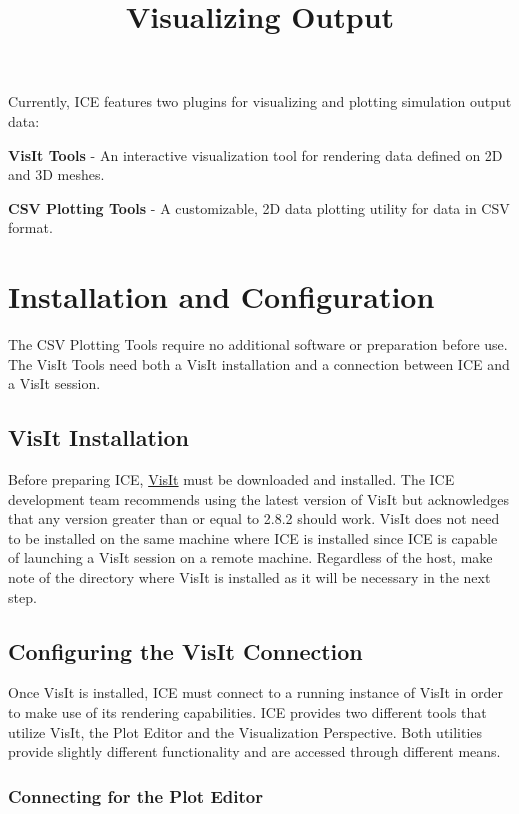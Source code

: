 \documentclass{article}
\begin{document}
\title{Visualizing Output}

Currently, ICE features two plugins for visualizing and plotting simulation
output data:

\textbf{VisIt Tools} - An interactive visualization tool for rendering data
defined on 2D and 3D meshes.

\textbf{CSV Plotting Tools} - A customizable, 2D data plotting utility for data
in CSV format.

\section{Installation and Configuration}

The CSV Plotting Tools require no additional software or preparation before use.
The VisIt Tools need both a VisIt installation and a connection between ICE and
a VisIt session.

\subsection{VisIt Installation} 

Before preparing ICE,
\href{https://wci.llnl.gov/simulation/computer-codes/visit/}{VisIt} must be
downloaded and installed. The ICE development team recommends using the latest
version of VisIt but acknowledges that any version greater than or equal to
2.8.2 should work. VisIt does not need to be installed on the same machine where
ICE is installed since ICE is capable of launching a VisIt session on a remote
machine. Regardless of the host, make note of the directory where VisIt is
installed as it will be necessary in the next step.

\subsection{Configuring the VisIt Connection}

Once VisIt is installed, ICE must connect to a running instance of VisIt in
order to make use of its rendering capabilities. ICE provides two different
tools that utilize VisIt, the Plot Editor and the Visualization Perspective.
Both utilities provide slightly different functionality and are accessed
through different means.

\subsubsection{Connecting for the Plot Editor} 
\end{document}
